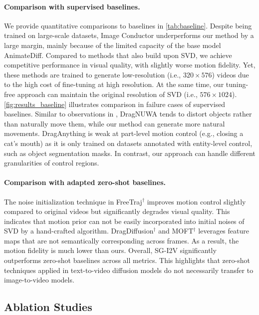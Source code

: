 \paragraph{Comparison with supervised baselines.}
We provide quantitative comparisons to baselines in \cref{tab:baseline}.
Despite being trained on large-scale datasets, Image Conductor underperforms our method by a large margin, mainly because of the limited capacity of the base model AnimateDiff.
Compared to methods that also build upon SVD, we achieve competitive performance in visual quality, with slightly worse motion fidelity.
Yet, these methods are trained to generate low-resolution (i.e., $320 \times 576$) videos due to the high cost of fine-tuning at high resolution. At the same time, our tuning-free approach can maintain the original resolution of SVD (i.e., $576 \times 1024$).
\cref{fig:results_baseline} illustrates comparison in failure cases of supervised baselines.
Similar to observations in \citep{wu2024draganything}, DragNUWA tends to distort objects rather than naturally move them, while our method can generate more natural movements. 
DragAnything is weak at part-level motion control (e.g., closing a cat's mouth) as it is only trained on datasets annotated with entity-level control, such as object segmentation masks.
In contrast, our approach can handle different granularities of control regions.


\vspace{-2.0mm}
\paragraph{Comparison with adapted zero-shot baselines.}
The noise initialization technique in FreeTraj$^\dagger$ improves motion control slightly compared to original videos but significantly degrades visual quality. %
This indicates that motion prior can not be easily incorporated into initial noises of SVD by a hand-crafted algorithm. 
DragDiffusion$^\dagger$ and MOFT$^\dagger$ leverages feature maps that are not semantically corresponding across frames.
As a result, the motion fidelity is much lower than ours.
Overall, SG-I2V significantly outperforms zero-shot baselines across all metrics.
This highlights that zero-shot techniques applied in text-to-video diffusion models do not necessarily transfer to image-to-video models.


\subsection{Ablation Studies}
\label{sec:ablation}


